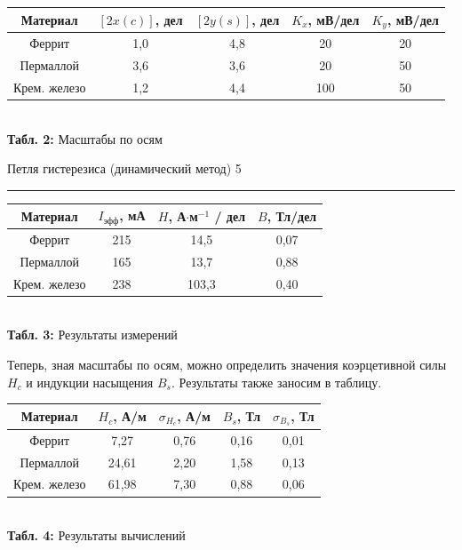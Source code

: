 \documentclass[12pt,a4paper]{scrartcl}
\begin{document}
\begin{center}
	\begin{tabular}{|c|c|c|c|c|}
		\hline
		Материал     & $[2x(c)]$, дел & $[2y(s)]$, дел & $K_x$, мВ/дел & $K_y$, мВ/дел \\ \hline
		Феррит       & 1,0            & 4,8            & 20            & 20            \\ \hline
		Пермаллой    & 3,6            & 3,6            & 20            & 50            \\ \hline
		Крем. железо & 1,2            & 4,4            & 100           & 50            \\ \hline
	\end{tabular}
	\\\textbf{Табл. 2:} Масштабы по осям
\end{center}	
	
	\newpage
	
	
	\begin{flushleft}
		\footnotesize{Петля гистерезиса (динамический метод)} \hspace{\fill} \footnotesize{5}
		\\[-0.3cm]\noindent\rule{\textwidth}{0.3pt}
	\end{flushleft}	
	
	\begin{center}
	\begin{tabular}{|c|c|c|c|}
		\hline
		Материал     & $I_\text{эфф}$, мА & $H$, А$\cdot$м$^{-1}$ / дел & $B$, Тл/дел \\ \hline
		Феррит       & 215                & 14,5                        & 0,07        \\ \hline
		Пермаллой    & 165                & 13,7                        & 0,88        \\ \hline
		Крем. железо & 238                & 103,3                       & 0,40        \\ \hline
	\end{tabular}
	\\\textbf{Табл. 3:} Результаты измерений
\end{center}
	
Теперь, зная масштабы по осям, можно определить значения коэрцетивной силы $ H_c $
и индукции насыщения $ B_s $. Результаты также заносим в таблицу.

\begin{center}
	\begin{tabular}{|c|c|c|c|c|}
		\hline
		Материал     & $H_c$, А/м & $\sigma_{H_c}$, А/м & $B_s$, Тл & $\sigma_{B_s}$, Тл \\ \hline
		Феррит       & 7,27       & 0,76                & 0,16      & 0,01               \\ \hline
		Пермаллой    & 24,61      & 2,20                & 1,58      & 0,13               \\ \hline
		Крем. железо & 61,98      & 7,30                & 0,88      & 0,06               \\ \hline
	\end{tabular}
	\\\textbf{Табл. 4:} Результаты вычислений
\end{center}
	
\end{document}
